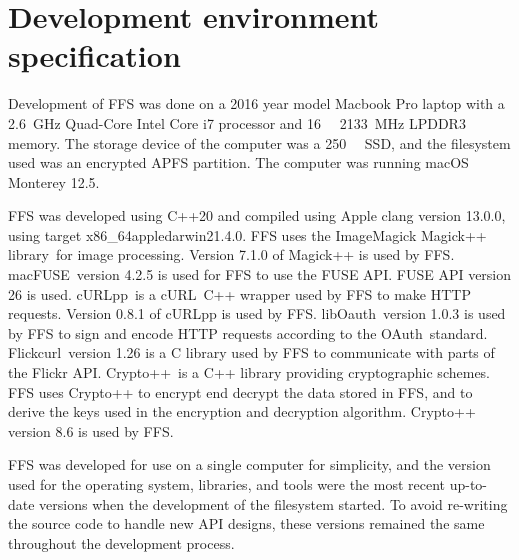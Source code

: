 \section{Development environment specification}
\label{sec:dev_env}
Development of \gls{FFS} was done on a 2016 year model Macbook Pro laptop with a \SI{2.6}{\giga\hertz} Quad-Core Intel Core i7 processor and \SI{16}{\giga\byte} \SI{2133}{\mega\hertz} LPDDR3 memory. The storage device of the computer was a \SI{250}{\giga\byte} \gls{SSD}, and the filesystem used was an encrypted \gls{APFS} partition. The computer was running macOS Monterey 12.5.

FFS was developed using C++20 and compiled using Apple clang version 13.0.0, using target x86\_64\-apple\-darwin21.4.0. \gls{FFS} uses the ImageMagick Magick++ library\,\cite{ImageMagick2022} for image processing. Version 7.1.0 of Magick++ is used by \gls{FFS}. macFUSE\,\cite{HomeMacFUSE} version 4.2.5 is used for \gls{FFS} to use the \gls{FUSE} \gls{API}. \gls{FUSE} \gls{API} version 26 is used. cURLpp\,\cite{barrette-lapierreCURLpp2022} is a cURL\,\cite{CurlCurl2022} C++ wrapper used by \gls{FFS} to make HTTP requests. Version 0.8.1 of cURLpp is used by \gls{FFS}. libOauth\,\cite{Liboauth} version 1.0.3 is used by \gls{FFS} to sign and encode HTTP requests according to the OAuth\,\cite{barrette-lapierreCURLpp2022} standard. Flickcurl\,\cite{beckettFlickcurlLibraryFlickr} version 1.26 is a C library used by \gls{FFS} to communicate with parts of the Flickr \gls{API}. Crypto++\,\cite{CryptoLibraryFree} is a C++ library providing cryptographic schemes. \gls{FFS} uses Crypto++ to encrypt end decrypt the data stored in \gls{FFS}, and to derive the keys used in the encryption and decryption algorithm. Crypto++ version 8.6 is used by \gls{FFS}.

FFS was developed for use on a single computer for simplicity, and the version used for the operating system, libraries, and tools were the most recent up-to-date versions when the development of the filesystem started. To avoid re-writing the source code to handle new \gls{API} designs, these versions remained the same throughout the development process.